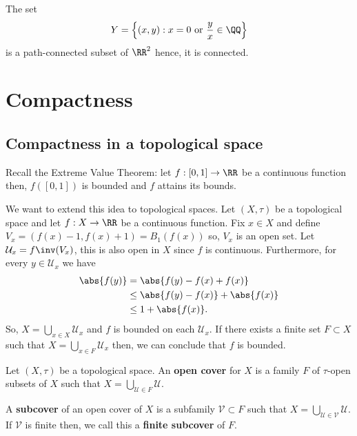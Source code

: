 \documentclass[12pt, a4paper]{article}
\begin{document}
\begin{example}
    The set
    \[Y = \left\{ (x,y): x=0 \text{ or } \frac{y}{x} \in \QQ \right\}\]
    is a path-connected subset of \(\RR^2\) hence, it is connected.
\end{example}

\pagebreak

\section{Compactness}

\subsection{Compactness in a topological space}

\begin{mdexample}
    Recall the Extreme Value Theorem: let \(f:[0,1] \to \RR\) be a continuous function then, \(f([0,1])\) is bounded and \(f\) attains its bounds.

    We want to extend this idea to topological spaces. Let \((X,\tau)\) be a topological space and let \(f:X \to \RR\) be a continuous function. Fix \(x \in X\) and define \(V_x=(f(x)-1,f(x)+1) = B_1(f(x))\) so, \(V_x\) is an open set. Let \(\mathcal{U}_x = f\inv(V_x)\), this is also open in \(X\) since \(f\) is continuous. Furthermore, for every \(y \in \mathcal{U}_x\) we have 
    \[\begin{aligned}
        \abs{f(y)} &= \abs{f(y)-f(x)+f(x)} \\
        &\leq \abs{f(y)-f(x)}+\abs{f(x)} \\
        &\leq 1+\abs{f(x)}.
    \end{aligned}\]
    So, \(X = \bigcup_{x \in X} \mathcal{U}_x\) and \(f\) is bounded on each \(\mathcal{U}_x\). If there exists a finite set \(F \subset X\) such that \(X = \bigcup_{x \in F} \mathcal{U}_x\) then, we can conclude that \(f\) is bounded.
\end{mdexample}

\begin{definition}
    Let \((X,\tau)\) be a topological space. An \textbf{open cover} for \(X\) is a family \(F\) of \(\tau\)-open subsets of \(X\) such that \(X = \bigcup_{\mathcal{U} \in F} \mathcal{U}\).
\end{definition}

\begin{definition}
    A \textbf{subcover} of an open cover of \(X\) is a subfamily \(\mathcal{V} \subset F\) such that \(X = \bigcup_{\mathcal{U} \in \mathcal{V}} \mathcal{U}\). If \(\mathcal{V}\) is finite then, we call this a \textbf{finite subcover} of \(F\).
\end{definition}
\end{document}
